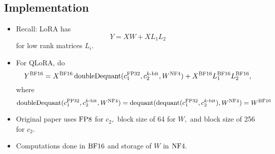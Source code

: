 \subsection{Implementation}
\begin{itemize}
    \item Recall: LoRA has
    \begin{equation*}
        Y = XW + XL_1L_2
    \end{equation*}
    for low rank matrices $L_i.$
    \item For QLoRA, do
    \begin{equation*}
        Y^{\mathrm{BF} 16} = X^{\mathrm{BF} 16}\operatorname{doubleDequant}(c_1^{\mathrm{FP} 32}, c_2^{k\text{-bit}}, W^{\mathrm{NF} 4}) + X^{\mathrm{BF} 16}L_1^{\mathrm{BF} 16}L_2^{\mathrm{BF} 16},
    \end{equation*}
    where
    \begin{equation*}
        \operatorname{doubleDequant}(c_1^{\mathrm{FP} 32}, c_2^{k\text{-bit}}, W^{\mathrm{NF} 4}) = \operatorname{dequant}(\operatorname{dequant}(c_1^{\mathrm{FP} 32}, c_2^{k\text{-bit}}), W^{\mathrm{NF} 4}) = W^{\mathrm{BF} 16}
    \end{equation*}
    \item Original paper \cite{qlora} uses $\mathrm{FP} 8$ for $c_2,$ block size of 64 for $W,$ and block size of 256 for $c_2.$
    \item Computations done in $\mathrm{BF} 16$ and storage of $W$ in $\mathrm{NF} 4.$
\end{itemize}